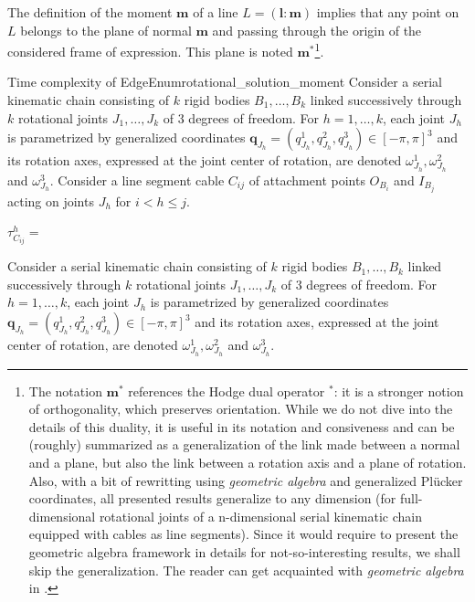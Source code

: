 The definition of the moment $\mathbf{m}$ of a line $L = (\mathbf{l} : \mathbf{m})$ implies that any point on $L$ belongs to the plane of normal $\mathbf{m}$ and passing through the origin of the considered frame of expression. This plane is noted $\mathbf{m}^*$\footnote{The notation $\mathbf{m}^*$ references the Hodge dual operator ${}^*$: it is a stronger notion of orthogonality, which preserves orientation. While we do not dive into the details of this duality, it is useful in its notation and consiveness and can be (roughly) summarized as a generalization of the link made between a normal and a plane, but also the link between a rotation axis and a plane of rotation. Also, with a bit of rewritting using \emph{geometric algebra} and generalized Plücker coordinates, all presented results generalize to any dimension (for full-dimensional rotational joints of a n-dimensional serial kinematic chain equipped with cables as line segments). Since it would require to present the geometric algebra framework in details for not-so-interesting results, we shall skip the generalization. The reader can get acquainted with \emph{geometric algebra} in \cite{dorstGeometricAlgebraComputer2007}.}.

\begin{theorembox}{Time complexity of EdgeEnum}{rotational_solution_moment}
    Consider a serial kinematic chain consisting of $k$ rigid bodies $B_1, \dots, B_k$ linked successively through $k$ rotational joints $J_1, \dots, J_k$ of 3 degrees of freedom. For $h=1,\dots, k$, each joint $J_h$ is parametrized by generalized coordinates $\mathbf{q}_{J_h} = (q_{J_h}^1, q_{J_h}^2, q_{J_h}^3)\in [-\pi, \pi]^3$ and its rotation axes, expressed at the joint center of rotation, are denoted $\omega_{J_h}^1, \omega_{J_h}^2$ and $\omega_{J_h}^3$. Consider a line segment cable $C_{ij}$ of attachment points $O_{B_i}$ and $I_{B_j}$ acting on joints $J_h$ for $i< h\leq j$.

    $\tau_{C_{ij}}^h = $
\end{theorembox}


Consider a serial kinematic chain consisting of $k$ rigid bodies $B_1, \dots, B_k$ linked successively through $k$ rotational joints $J_1, \dots, J_k$ of 3 degrees of freedom. For $h=1,\dots, k$, each joint $J_h$ is parametrized by generalized coordinates $\mathbf{q}_{J_h} = (q_{J_h}^1, q_{J_h}^2, q_{J_h}^3)\in [-\pi, \pi]^3$ and its rotation axes, expressed at the joint center of rotation, are denoted $\omega_{J_h}^1, \omega_{J_h}^2$ and $\omega_{J_h}^3$. 


